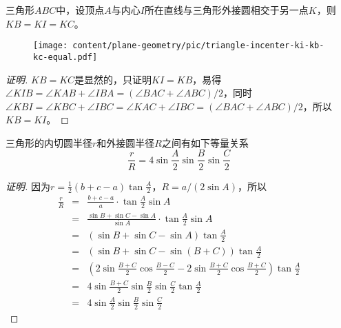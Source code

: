 \begin{property}
  \label{property:triangle-incenter-ki-kb-kc-equal}
  三角形$ABC$中，设顶点$A$与内心$I$所在直线与三角形外接圆相交于另一点$K$，则$KB=KI=KC$。
\end{property}

\begin{figure}[htbp]
\centering
\texttt{[image: content/plane-geometry/pic/triangle-incenter-ki-kb-kc-equal.pdf]}
\caption{}
\label{fig:triangle-incenter-ki-kb-kc-equal}
\end{figure}

\begin{proof}[证明]
  $KB=KC$是显然的，只证明$KI=KB$，易得$\angle KIB=\angle KAB + \angle IBA = (\angle BAC + \angle ABC)/2$，同时$\angle KBI = \angle KBC + \angle IBC = \angle KAC + \angle IBC = (\angle BAC + \angle ABC)/2$，所以$KB=KI$。
\end{proof}

\begin{property}
  \label{property:ration-inradius-and-circumradius-of-triangle}
  三角形的内切圆半径$r$和外接圆半径$R$之间有如下等量关系
  \begin{equation}
    \label{eq:inradius-and-circumradius-ration}
    \frac{r}{R} = 4 \sin{\frac{A}{2}} \sin{\frac{B}{2}} \sin{\frac{C}{2}}
  \end{equation}
\end{property}

\begin{proof}[证明]
  因为$r=\frac{1}{2}(b+c-a)\tan{\frac{A}{2}}$，$R=a/(2\sin{A})$，所以
  \begin{eqnarray*}
    \frac{r}{R} & = & \frac{b+c-a}{a} \cdot \tan{\frac{A}{2}}\sin{A}\\
                & = & \frac{\sin{B} + \sin{C} - \sin{A}}{\sin{A}} \cdot \tan{\frac{A}{2}}\sin{A} \\
                & = & (\sin{B} + \sin{C} - \sin{A}) \tan{\frac{A}{2}} \\
                & = & (\sin{B} + \sin{C} - \sin{(B+C)}) \tan{\frac{A}{2}} \\
                & = & \left( 2\sin{\frac{B+C}{2}}\cos{\frac{B-C}{2}}-2\sin{\frac{B+C}{2}}\cos{\frac{B+C}{2}} \right) \tan{\frac{A}{2}} \\
                & = & 4\sin{\frac{B+C}{2}}\sin{\frac{B}{2}}\sin{\frac{C}{2}}\tan{\frac{A}{2}} \\
    & = & 4 \sin{\frac{A}{2}}\sin{\frac{B}{2}}\sin{\frac{C}{2}}
  \end{eqnarray*}
\end{proof}


